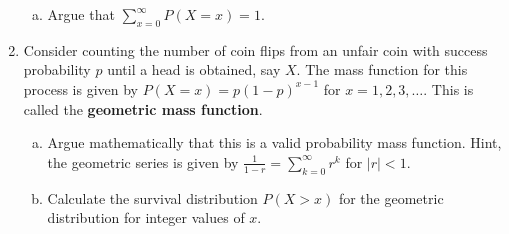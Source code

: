\documentclass[12pt]{article}
\begin{document}
\begin{enumerate}[Problem 1.]
\begin{enumerate}[a.]
\item Argue that $\sum_{x=0}^\infty P(X = x) = 1$.
\end{enumerate}
\item Consider counting the number of coin flips from an unfair coin with success probability $p$ until a head is obtained, say $X$. The mass
function for this process is given by $P(X = x) = p(1 - p)^{x-1}$ for $x = 1, 2, 3, \ldots$.
This is called the {\bf geometric mass function}.
\begin{enumerate}[a.]
\item Argue mathematically that this is a valid probability mass function. Hint, the geometric series is given by $\frac{1}{1-r} = \sum_{k=0}^\infty r^k$ for $|r| < 1$.
\item Calculate the survival distribution $P(X > x)$ for the geometric distribution for
integer values of $x$.
\end{enumerate}
\end{enumerate}
\end{document}
